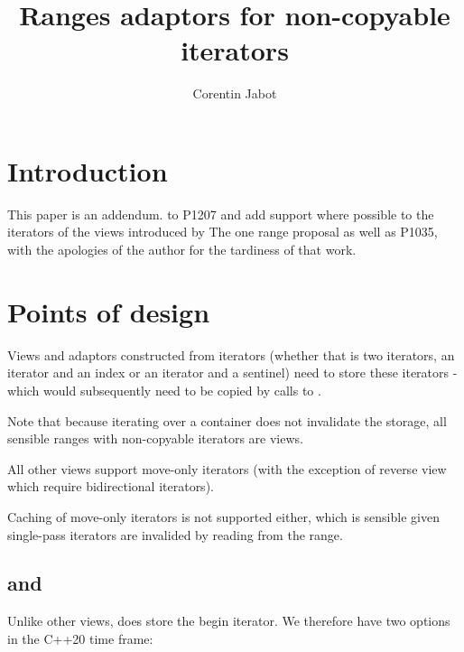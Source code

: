 \documentclass{wg21}
\title{Ranges adaptors for non-copyable iterators}
\author{Corentin Jabot}{corentin.jabot@gmail.com}
\begin{document}
\maketitle


\hypertarget{introduction}{%
	\section{Introduction}\label{introduction}}


This paper is an addendum. to P1207 and add support where possible to the iterators of the views introduced by
The one range proposal as well as P1035, with the apologies of the author for the tardiness of that work.

\section{Points of design}

Views and adaptors constructed from iterators (whether that is two iterators, an iterator and an index or an iterator and a sentinel) need to store these iterators - which would subsequently need to be copied by calls to .

Note that because iterating over a container does not invalidate the storage, all sensible ranges with non-copyable iterators are views.


All other views support move-only iterators (with the exception of reverse view which require bidirectional iterators).

Caching of move-only iterators is not supported either, which is sensible given single-pass iterators are invalided by reading from the range.
\newpage
\subsection{ and }

Unlike other views,  does store the begin iterator.
We therefore have two options in the C++20 time frame:
\end{document}
